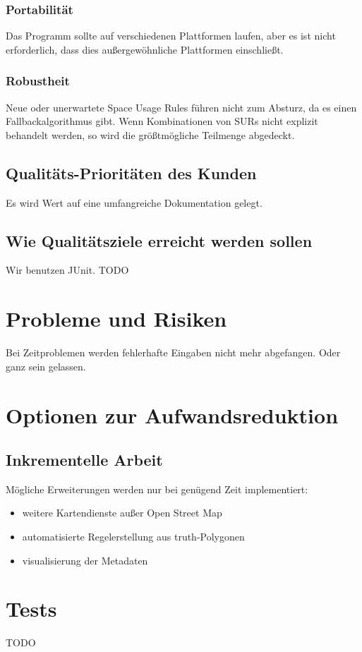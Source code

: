 \subsubsection{Portabilität}
Das Programm sollte auf verschiedenen Plattformen laufen, aber es ist nicht erforderlich, dass dies außergewöhnliche Plattformen einschließt.

\subsubsection{Robustheit}
Neue oder unerwartete Space Usage Rules führen nicht zum Absturz, da es einen Fallbackalgorithmus gibt. Wenn Kombinationen von 
SURs nicht explizit behandelt werden, so wird die größtmögliche Teilmenge abgedeckt.

\subsection{Qualitäts-Prioritäten des Kunden}
Es wird Wert auf eine umfangreiche Dokumentation gelegt.
\subsection{Wie Qualitätsziele erreicht werden sollen}
Wir benutzen JUnit. TODO
\section{Probleme und Risiken}
Bei Zeitproblemen werden fehlerhafte Eingaben nicht mehr abgefangen. Oder ganz sein gelassen.
\section{Optionen zur Aufwandsreduktion}
\subsection{Inkrementelle Arbeit}
Mögliche Erweiterungen werden nur bei genügend Zeit implementiert:
\begin{itemize}
 \item weitere Kartendienste außer Open Street Map
 \item automatisierte Regelerstellung aus truth-Polygonen
 \item visualisierung der Metadaten
\end{itemize}

\section{Tests}
TODO